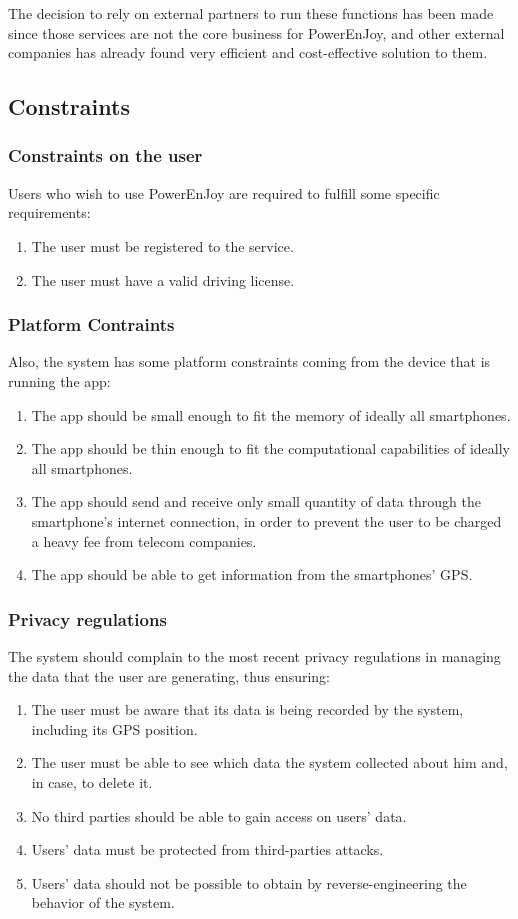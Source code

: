 \documentclass[11pt]{article} %
\newcommand{\pe}{PowerEnJoy }
\newcommand{\pecomma}{PowerEnJoy, }
\begin{document}
 The decision to rely on external partners to run these functions has been made since those services are not the core business for \pecomma and other external companies has already found very efficient and cost-effective solution to them.


\subsection{Constraints}
  
\subsubsection{Constraints on the user}
Users who wish to use \pe are required to fulfill some specific requirements:
\begin{enumerate}
	\item The user must be registered to the service.
	\item The user must have a valid driving license.
\end{enumerate}

\subsubsection{Platform Contraints}
Also, the system has some platform constraints coming from the device that is running the app:
\begin{enumerate}
	\item The app should be small enough to fit the memory of ideally all smartphones.
	\item The app should be thin enough to fit the computational capabilities of ideally all smartphones.
	\item The app should send and receive only small quantity of data through the smartphone's internet connection, in order to prevent the user to be charged a heavy fee from telecom companies.
	\item The app should be able to get information from the smartphones' GPS.
  \end{enumerate}

\subsubsection{Privacy regulations}
The system should complain to the most recent privacy regulations in managing the data that the user are generating, thus ensuring:
\begin{enumerate}
	\item The user must be aware that its data is being recorded by the system, including its GPS position.
	\item The user must be able to see which data the system collected about him and, in case, to delete it.
	\item No third parties should be able to gain access on users' data.
	\item Users' data must be protected from third-parties attacks.
	\item Users' data should not be possible to obtain by reverse-engineering the behavior of the system.
\end{enumerate}
\end{document}

